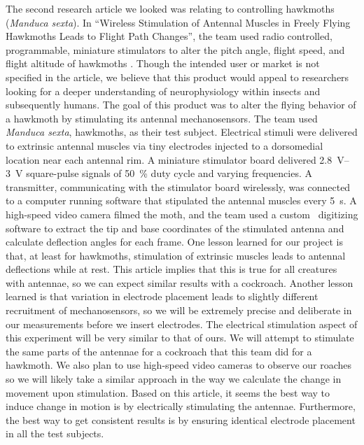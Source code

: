 \documentclass[twocolumn,10pt]{IEEEtran}
\begin{document}
The second research article we looked was relating to controlling hawkmoths (\emph{Manduca sexta}). In ``Wireless Stimulation of Antennal Muscles in Freely Flying Hawkmoths Leads to Flight Path Changes'', the team used radio controlled, programmable, miniature stimulators to alter the pitch angle, flight speed, and flight altitude of hawkmoths \cite{hinterwirth2012wireless}. Though the intended user or market is not specified in the article, we believe that this product would appeal to researchers looking for a deeper understanding of neurophysiology within insects and subsequently humans. The goal of this product was to alter the flying behavior of a hawkmoth by stimulating its antennal mechanosensors. The team used \emph{Manduca sexta}, hawkmoths, as their test subject. Electrical stimuli were delivered to extrinsic antennal muscles via tiny electrodes injected to a dorsomedial location near each antennal rim. A miniature stimulator board delivered \SIrange{2.8}{3}{\volt} square-pulse signals of \SI{50}{\percent} duty cycle and varying frequencies. A transmitter, communicating with the stimulator board wirelessly, was connected to a computer running software that stipulated the antennal muscles every \SI{5}{\second}. A high-speed video camera filmed the moth, and the team used a custom \Matlab\ digitizing software to extract the tip and base coordinates of the stimulated antenna and calculate deflection angles for each frame. One lesson learned for our project is that, at least for hawkmoths, stimulation of extrinsic muscles leads to antennal deflections while at rest. This article implies that this is true for all creatures with antennae, so we can expect similar results with a cockroach. Another lesson learned is that variation in electrode placement leads to slightly different recruitment of mechanosensors, so we will be extremely precise and deliberate in our measurements before we insert electrodes. The electrical stimulation aspect of this experiment will be very similar to that of ours. We will attempt to stimulate the same parts of the antennae for a cockroach that this team did for a hawkmoth. We also plan to use high-speed video cameras to observe our roaches so we will likely take a similar approach in the way we calculate the change in movement upon stimulation. Based on this article, it seems the best way to induce change in motion is by electrically stimulating the antennae. Furthermore, the best way to get consistent results is by ensuring identical electrode placement in all the test subjects. 
\end{document}

